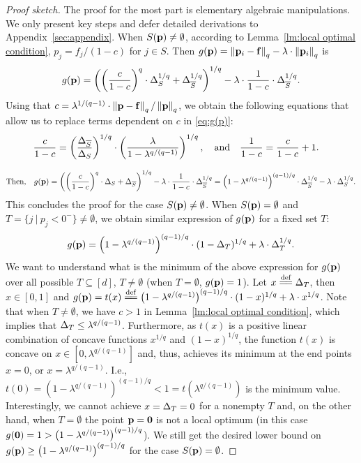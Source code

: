 \begin{proof}[Proof sketch]
The proof for the most part is elementary algebraic manipulations. We only present key steps and defer detailed derivations to Appendix~\ref{sec:appendix}.
When $S(\mathbf{p})\neq\emptyset$, according to Lemma~\ref{lm:local optimal condition}, $p_j=f_j/(1-c)$ for $j\in S$. Then $g(\mathbf{p})=\left\Vert \mathbf{p}_{i}-\mathbf{f}\right\Vert_{q}-\lambda\cdot\left\Vert \mathbf{p}_{i}\right\Vert_{q}$ is
\begin{align}
\label{eq:g(p)}
g(\mathbf{p})=\left(\left(\frac{c}{1-c}\right)^q\cdot\Delta_{S}^{1/q}+\Delta_{\overline{S}}^{1/q}\right)^{1/q}-\lambda\cdot\frac{1}{1-c}\cdot\Delta_{\overline{S}}^{1/q}.
\end{align}
Using that $c=\lambda^{1/(q-1)}\cdot\left\Vert \mathbf{p}-\mathbf{f}\right\Vert_{q}/\left\Vert \mathbf{p}\right\Vert_{q}$, we obtain the following equations that allow us to replace terms dependent on $c$ in \eqref{eq:g(p)}:
\begin{align*}
&\frac{c}{1-c}=\left(\frac{{\Delta_{{\overline{S}}}}}{\Delta_{{S}}}\right)^{1/q}\cdot\left(\frac{\lambda}{1-\lambda^{q/(q-1)}}\right)^{1/q},\quad\text{and}\quad\frac{1}{1-c}=\frac{c}{1-c}+1.
\end{align*}

\[
\text{Then,}\quad g(\mathbf{p})=\left(\left(\frac{c}{1-c}\right)^q\cdot\Delta_{{S}}+{\Delta_{{\overline{S}}}}\right)^{1/q}-\lambda\cdot\frac{1}{1-c}\cdot\Delta_{\overline{S}}^{1/q}
=\left(1-\lambda^{q/(q-1)}\right)^{(q-1)/q}\cdot\Delta_{\overline{S}}^{1/q}-\lambda\cdot\Delta_{S}^{1/q}.
\]
This concludes the proof for the case $S(\mathbf{p})\ne\emptyset$. When $S(\mathbf{p})=\emptyset$ and $T=\{j~|~p_j< 0^-\}\neq\emptyset$, we obtain similar expression of $g(\mathbf{p})$ for a fixed set $T$: 
\begin{align*}
g(\mathbf{p})=
        \left(1-\lambda^{q/(q-1)}\right)^{(q-1)/q}\cdot(1-\Delta_{{T}})^{1/q}+\lambda\cdot\Delta_{T}^{1/q}.
\end{align*}
We want to understand what is the minimum of the above expression for $g(\mathbf{p})$ over 
all possible $T\subseteq[d]$, $T\ne\emptyset$ (when $T=\emptyset$, $g(\mathbf{p})=1$). Let 
$x\overset{\mathrm{def}}{=\mathrel{\mkern-3mu}=}\Delta_{{T}}$, then $x\in[0,1]$ and $g(\mathbf{p})=t(x)\overset{\mathrm{def}}{=\mathrel{\mkern-3mu}=}\left(1-\lambda^{q/(q-1)}\right)^{(q-1)/q}\cdot(1-x)^{1/q}+\lambda\cdot x^{1/q}$. Note that when 
$T\ne\emptyset$, we have $c>1$ in Lemma~\ref{lm:local optimal condition}, which 
implies that $\Delta_{{T}}\le\lambda^{q/(q-1)}$. Furthermore, as $t(x)$ is a positive 
linear combination of concave functions $x^{1/q}$ and $(1-x)^{1/q}$, the function 
$t(x)$ is concave on $x\in[0,\lambda^{q/(q-1)}]$ and, thus, achieves its minimum at 
the end points $x=0$, or $x=\lambda^{q/(q-1)}$. I.e., $t(0)=\left(1-\lambda^{q/(q-1)}\right)^{(q-1)/q}< 1=t(\lambda^{q/(q-1)})$ is the minimum value. Interestingly, we 
cannot achieve $x=\Delta_{{T}}=0$ for a nonempty $T$ and, on the other hand, when $T=\emptyset$ the point $\mathbf{p}=\mathbf{0}$ is not a local optimum (in this case $g(\mathbf{0})=1>\left(1-\lambda^{q/(q-1)}\right)^{(q-1)/q}$). We still get the desired lower bound on $g(\mathbf{p})\ge\left(1-\lambda^{q/(q-1)}\right)^{(q-1)/q}$ for the case $S(\mathbf{p})=\emptyset$.
\end{proof}


